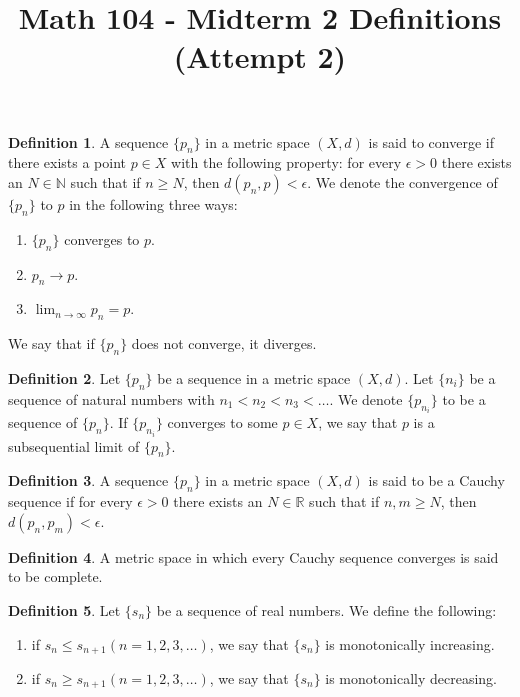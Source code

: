 \documentclass[12pt]{article}
\theoremstyle{definition}
\newtheorem{definition}{Definition}
\theoremstyle{named}
\begin{document}
\title{Math 104 - Midterm 2 Definitions (Attempt 2)}
\author{}
\date{}
\maketitle
\date

\renewcommand{\thedefinition}{3.1}
\begin{definition}
    A sequence $\{p_n\}$ in a metric space $(X,d)$ is said to converge if there exists a point $p \in X$ with the following property: for every $\epsilon > 0$ there exists an $N \in \mathbb{N}$ such that if $n \geq N$, then $d(p_n, p) < \epsilon$. We denote the convergence of $\{p_n\}$ to $p$ in the following three ways: 
    \begin{enumerate}
        \item $\{p_n\}$ converges to $p$. 
        \item $p_n \to p$. 
        \item $\lim_{n \to \infty} p_n = p$. 
    \end{enumerate}
    We say that if $\{p_n\}$ does not converge, it diverges. 
\end{definition}

\renewcommand{\thedefinition}{3.5}
\begin{definition}
    Let $\{p_n\}$ be a sequence in a metric space $(X,d)$. Let $\{n_i\}$ be a sequence of natural numbers with $n_1 < n_2 < n_3 < \dots$. We denote $\{p_{n_i}\}$ to be a sequence of $\{p_n\}$. If $\{p_{n_i}\}$ converges to some $p \in X$, we say that $p$ is a subsequential limit of $\{p_n\}$. 
\end{definition}

\renewcommand{\thedefinition}{3.8}
\begin{definition}
    A sequence $\{p_n\}$ in a metric space $(X,d)$ is said to be a Cauchy sequence if for every $\epsilon > 0$ there exists an $N \in \mathbb{R}$ such that if $n, m \geq N$, then $d\left(p_n, p_m\right) < \epsilon$. 
\end{definition}

\renewcommand{\thedefinition}{3.12}
\begin{definition}
    A metric space in which every Cauchy sequence converges is said to be complete. 
\end{definition}

\renewcommand{\thedefinition}{3.13}
\begin{definition}
    Let $\{s_n\}$ be a sequence of real numbers. We define the following: 
    \begin{enumerate}
        \item if $s_n \leq s_{n+1} (n=1,2,3,\dots)$, we say that $\{s_n\}$ is monotonically increasing. 
        \item if $s_n \geq s_{n+1} (n=1,2,3,\dots)$, we say that $\{s_n\}$ is monotonically decreasing. 
    \end{enumerate}
\end{definition}
\end{document}
